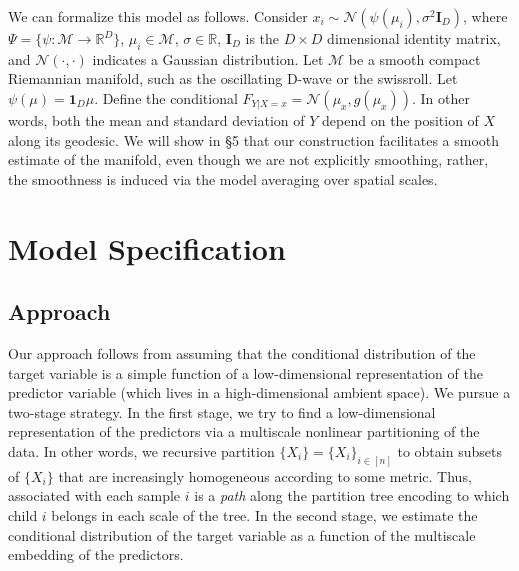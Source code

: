 \documentclass{article}
\newcommand{\Real}{\mathbb{R}}
\providecommand{\mb}[1]{\boldsymbol{#1}}
\providecommand{\mc}[1]{\mathcal{#1}}
\newcommand{\from}{{\ensuremath{\colon}}}           %
\begin{document}
We can formalize this model as follows. Consider $x_i \sim \mc{N}(\psi(\mu_i),\sigma^2 \mb{I}_D)$, where $\Psi =\{ \psi \from \mc{M} \to \Real^D\}$, $\mu_i \in \mc{M}$, $\sigma \in \Real$, $\mb{I}_D$ is the $D\times D$ dimensional identity matrix, and $\mc{N}(\cdot,\cdot)$ indicates a Gaussian distribution.  Let $\mc{M}$ be a smooth compact Riemannian manifold, such as the oscillating D-wave or the swissroll.  Let $\psi(\mu)=\mb{1}_D \mu$. Define the conditional $F_{Y|X=x} = \mc{N}( \mu_x, g(\mu_x))$. In other words, both the mean and standard deviation of $Y$ depend on the position of $X$ along its geodesic. We will show in \S 5 that  our construction facilitates a smooth estimate of the manifold, even though we are not explicitly smoothing, rather, the smoothness is induced via the  model averaging over spatial scales.

\section{Model Specification} %
\label{sec:approach}
\subsection{Approach}


Our approach follows from assuming that the conditional distribution of the target variable is a simple function of a low-dimensional representation of the predictor variable (which lives in a high-dimensional ambient space).  We pursue a two-stage strategy.  In the first stage, we try to find a low-dimensional representation of the predictors via a multiscale nonlinear partitioning of the data.  In other words, we recursive partition $\{X_i\}=\{X_i\}_{i \in [n]}$ to obtain subsets of $\{X_i\}$ that are increasingly homogeneous according to some metric.  Thus, associated with each sample $i$ is a \emph{path} along the partition tree encoding to which child $i$ belongs in each scale of the tree.  In the second stage, we estimate the conditional distribution of the target variable as a function of the multiscale embedding of the predictors.

% 

\end{document}
